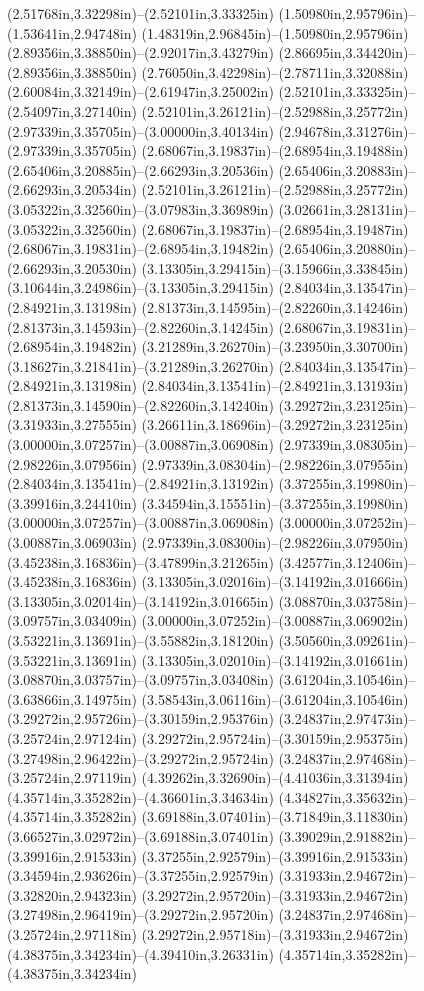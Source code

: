 (2.51768in,3.32298in)--(2.52101in,3.33325in) (1.50980in,2.95796in)--(1.53641in,2.94748in) (1.48319in,2.96845in)--(1.50980in,2.95796in) (2.89356in,3.38850in)--(2.92017in,3.43279in) (2.86695in,3.34420in)--(2.89356in,3.38850in) (2.76050in,3.42298in)--(2.78711in,3.32088in) (2.60084in,3.32149in)--(2.61947in,3.25002in) (2.52101in,3.33325in)--(2.54097in,3.27140in) (2.52101in,3.26121in)--(2.52988in,3.25772in) (2.97339in,3.35705in)--(3.00000in,3.40134in) (2.94678in,3.31276in)--(2.97339in,3.35705in) (2.68067in,3.19837in)--(2.68954in,3.19488in) (2.65406in,3.20885in)--(2.66293in,3.20536in) (2.65406in,3.20883in)--(2.66293in,3.20534in) (2.52101in,3.26121in)--(2.52988in,3.25772in) (3.05322in,3.32560in)--(3.07983in,3.36989in) (3.02661in,3.28131in)--(3.05322in,3.32560in) (2.68067in,3.19837in)--(2.68954in,3.19487in) (2.68067in,3.19831in)--(2.68954in,3.19482in) (2.65406in,3.20880in)--(2.66293in,3.20530in) (3.13305in,3.29415in)--(3.15966in,3.33845in) (3.10644in,3.24986in)--(3.13305in,3.29415in) (2.84034in,3.13547in)--(2.84921in,3.13198in) (2.81373in,3.14595in)--(2.82260in,3.14246in) (2.81373in,3.14593in)--(2.82260in,3.14245in) (2.68067in,3.19831in)--(2.68954in,3.19482in) (3.21289in,3.26270in)--(3.23950in,3.30700in) (3.18627in,3.21841in)--(3.21289in,3.26270in) (2.84034in,3.13547in)--(2.84921in,3.13198in) (2.84034in,3.13541in)--(2.84921in,3.13193in) (2.81373in,3.14590in)--(2.82260in,3.14240in) (3.29272in,3.23125in)--(3.31933in,3.27555in) (3.26611in,3.18696in)--(3.29272in,3.23125in) (3.00000in,3.07257in)--(3.00887in,3.06908in) (2.97339in,3.08305in)--(2.98226in,3.07956in) (2.97339in,3.08304in)--(2.98226in,3.07955in) (2.84034in,3.13541in)--(2.84921in,3.13192in) (3.37255in,3.19980in)--(3.39916in,3.24410in) (3.34594in,3.15551in)--(3.37255in,3.19980in) (3.00000in,3.07257in)--(3.00887in,3.06908in) (3.00000in,3.07252in)--(3.00887in,3.06903in) (2.97339in,3.08300in)--(2.98226in,3.07950in) (3.45238in,3.16836in)--(3.47899in,3.21265in) (3.42577in,3.12406in)--(3.45238in,3.16836in) (3.13305in,3.02016in)--(3.14192in,3.01666in) (3.13305in,3.02014in)--(3.14192in,3.01665in) (3.08870in,3.03758in)--(3.09757in,3.03409in) (3.00000in,3.07252in)--(3.00887in,3.06902in) (3.53221in,3.13691in)--(3.55882in,3.18120in) (3.50560in,3.09261in)--(3.53221in,3.13691in) (3.13305in,3.02010in)--(3.14192in,3.01661in) (3.08870in,3.03757in)--(3.09757in,3.03408in) (3.61204in,3.10546in)--(3.63866in,3.14975in) (3.58543in,3.06116in)--(3.61204in,3.10546in) (3.29272in,2.95726in)--(3.30159in,2.95376in) (3.24837in,2.97473in)--(3.25724in,2.97124in) (3.29272in,2.95724in)--(3.30159in,2.95375in) (3.27498in,2.96422in)--(3.29272in,2.95724in) (3.24837in,2.97468in)--(3.25724in,2.97119in) (4.39262in,3.32690in)--(4.41036in,3.31394in) (4.35714in,3.35282in)--(4.36601in,3.34634in) (4.34827in,3.35632in)--(4.35714in,3.35282in) (3.69188in,3.07401in)--(3.71849in,3.11830in) (3.66527in,3.02972in)--(3.69188in,3.07401in) (3.39029in,2.91882in)--(3.39916in,2.91533in) (3.37255in,2.92579in)--(3.39916in,2.91533in) (3.34594in,2.93626in)--(3.37255in,2.92579in) (3.31933in,2.94672in)--(3.32820in,2.94323in) (3.29272in,2.95720in)--(3.31933in,2.94672in) (3.27498in,2.96419in)--(3.29272in,2.95720in) (3.24837in,2.97468in)--(3.25724in,2.97118in) (3.29272in,2.95718in)--(3.31933in,2.94672in) (4.38375in,3.34234in)--(4.39410in,3.26331in) (4.35714in,3.35282in)--(4.38375in,3.34234in) 